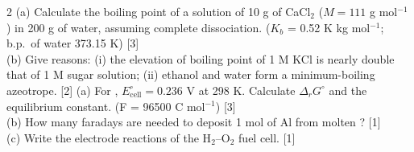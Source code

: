 \documentclass[10pt,a4paper]{extarticle}
\newcommand{\mk}[1]{{\scriptsize\color{black!55}[#1]}}
\begin{document}
\begin{multicols}{2}
\Q (a) Calculate the boiling point of a solution of 10 g of CaCl$_2$ ($M=111$ g mol$^{-1}$) in 200 g of water, assuming complete dissociation. ($K_b$ = 0.52 K kg mol$^{-1}$; b.p.\ of water 373.15 K) \mk{3}\\
(b) Give reasons: (i) the elevation of boiling point of 1 M KCl is nearly double that of 1 M sugar solution; (ii) ethanol and water form a minimum-boiling azeotrope. \mk{2}
\Q (a) For , $E^\circ_\text{cell}=0.236$ V at 298 K. Calculate $\Delta_rG^\circ$ and the equilibrium constant. (F = 96500 C mol$^{-1}$) \mk{3}\\
(b) How many faradays are needed to deposit 1 mol of Al from molten ? \mk{1}\\
(c) Write the electrode reactions of the H$_2$--O$_2$ fuel cell. \mk{1}
\end{multicols}
\end{document}
